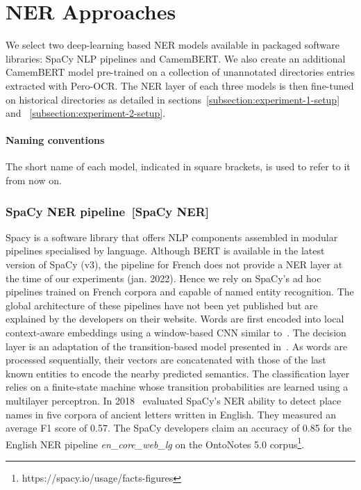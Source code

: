 \section{NER Approaches}
We select two deep-learning based NER models available in packaged software libraries: SpaCy NLP pipelines and CamemBERT.
We also create an additional CamemBERT model pre-trained on a collection of unannotated directories entries extracted with Pero-OCR.
The NER layer of each three models is then fine-tuned on historical directories as detailed in sections~\ref{subsection:experiment-1-setup} and ~\ref{subsection:experiment-2-setup}.

\paragraph{Naming conventions} The short name of each model, indicated in square brackets, is used to refer to it from now on.


\subsubsection{SpaCy NER pipeline~[SpaCy NER]}
Spacy is a software library that offers NLP components assembled in modular pipelines specialised by language.
Although BERT is available in the latest version of SpaCy (v3), the pipeline for French does not provide a NER layer at the time of our experiments (jan. 2022).
Hence we rely on SpaCy's ad hoc pipelines trained on French corpora and capable of named entity recognition.
The global architecture of these pipelines have not been yet published but are explained by the developers on their website.
Words are first encoded into local context-aware embeddings using a window-based CNN similar to~\cite{collobert2011}.
The decision layer is an adaptation of the transition-based model presented in~\cite{lample2016}.
As words are processed sequentially, their vectors are concatenated with those of the last known entities to encode the nearby predicted semantics.
The classification layer relies on a finite-state machine whose transition probabilities are learned using a multilayer perceptron.
In 2018~\cite{won2018} evaluated SpaCy's NER ability to detect place names in five corpora of ancient letters written in English.
They measured an average F1 score of 0.57.
The SpaCy developers claim an accuracy of 0.85 for the English NER pipeline \textit{en\_core\_web\_lg} on the OntoNotes 5.0 corpus\footnote{https://spacy.io/usage/facts-figures}.

